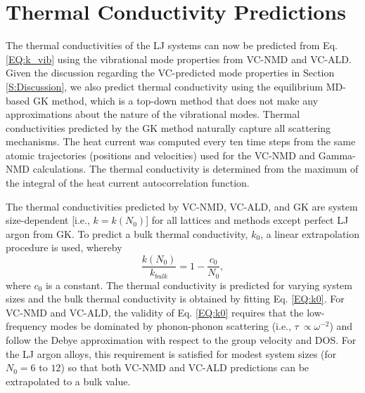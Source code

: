 \documentclass[aps,prb,onecolumn,preprint,footinbib,superscriptaddress,amsmath,amssymb,floatfix]{revtex4}
\begin{document}

\section{\label{S:Thermal Conductivity}Thermal Conductivity Predictions}

The thermal conductivities of the LJ systems can now be predicted from 
Eq. \eqref{EQ:k_vib} using the vibrational mode properties 
from VC-NMD and VC-ALD. Given the discussion regarding the 
VC-predicted mode properties in Section \ref{S:Discussion}, 
we also predict thermal conductivity using the equilibrium 
MD-based GK method, which is a top-down method that does not make any 
approximations about the nature of the vibrational modes. 
Thermal conductivities predicted by the GK method 
naturally capture all scattering mechanisms.
\cite{skye_thermal_2008,landry_complex_2008,landry_effect_2009} 
The heat current was computed every ten time steps from the same atomic 
trajectories (positions and velocities) used for the VC-NMD and 
Gamma-NMD calculations.  The thermal conductivity is 
determined from the maximum of the integral of the heat 
current autocorrelation function.

The thermal conductivities predicted by VC-NMD, VC-ALD, and GK are system 
size-dependent [i.e., $k = k(N_0)$] for all lattices and methods except 
perfect LJ argon from GK. To predict a bulk thermal conductivity, $k_0$,  
a linear extrapolation procedure is 
used, whereby 
\begin{equation}\label{EQ:k0}
\frac{k(N_0)}{k_{bulk}} = 1 - \frac{c_0}{N_0},
\end{equation}
where $c_0$ is a constant.\cite{shiomi_thermal_2011} The thermal conductivity 
is predicted for varying system sizes and the bulk thermal conductivity is 
obtained by fitting Eq. \eqref{EQ:k0}. 
For VC-NMD and VC-ALD, the validity of Eq. \eqref{EQ:k0}  
requires that the low-frequency modes be dominated by 
phonon-phonon scattering (i.e., $\tau\ \propto \omega^{-2}$) and  
follow the Debye approximation 
with respect to the group velocity and DOS.
\cite{shiomi_thermal_2011,esfarjani_heat_2011} For the LJ 
argon alloys, this requirement is satisfied for modest system sizes 
(for $N_0 = 6$ to $12$) so that both VC-NMD and VC-ALD predictions 
can be extrapolated to a bulk value. 
\end{document}
